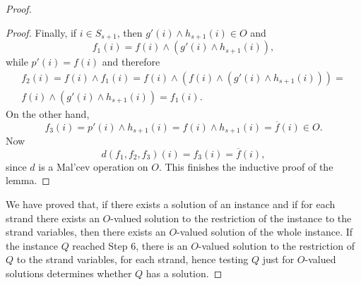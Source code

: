 \documentclass[10pt,a4paper]{amsart}
\newcommand{\mt}{\wedge}
\begin{document}
\begin{proof}
\begin{proof}
Finally, if $i\in S_{s+1}$, then $g'(i)\mt h_{s+1}(i)\in O$ and $$f_1(i)=f(i)\mt(g'(i)\mt h_{s+1}(i)),$$ while $p'(i)=f(i)$ and therefore 
$$
\begin{gathered}
f_2(i)=f(i)\mt f_1(i)=f(i)\mt (f(i)\mt(g'(i)\mt h_{s+1}(i)))=\\
f(i)\mt(g'(i)\mt h_{s+1}(i))=f_1(i).
\end{gathered}
$$ 
On the other hand, $$f_3(i)=p'(i)\mt h_{s+1}(i)=f(i)\mt h_{s+1}(i)=\overline{f}(i)\in O.$$ Now $$d(f_1,f_2,f_3)(i)=f_3(i)=\overline{f}(i),$$ since $d$ is a Mal'cev operation on $O$. This finishes the inductive proof of the lemma.
\end{proof}
We have proved that, if there exists a solution of an instance and if for each strand there exists an $O$-valued solution to the restriction of the instance to the strand variables, then there exists an $O$-valued solution of the whole instance. If the instance $Q$ reached Step 6, there is an $O$-valued solution to the restriction of $Q$ to the strand variables, for each strand, hence testing $Q$ just for $O$-valued solutions determines whether $Q$ has a solution. 
\end{proof}
\end{document}
